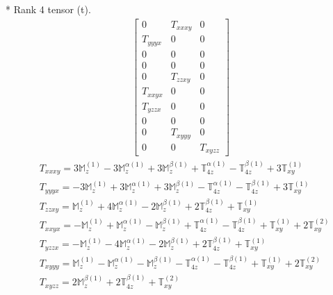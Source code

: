 \documentclass[fleqn,8pt,landscape]{jsarticle}
\begin{document}
* Rank 4 tensor (t).
\begin{align*}
\begin{bmatrix} 0 & T_{xxxy} & 0 \\ T_{yyyx} & 0 & 0 \\ 0 & 0 & 0 \\ 0 & 0 & 0 \\ 0 & T_{zzxy} & 0 \\ T_{xxyx} & 0 & 0 \\ T_{yzzx} & 0 & 0 \\ 0 & 0 & 0 \\ 0 & T_{xyyy} & 0 \\ 0 & 0 & T_{xyzz} \end{bmatrix}
\end{align*}
\begin{align*}
& T_{xxxy} = 3 \mathbb{M}_{z}^{(1)} - 3 \mathbb{M}_{z}^{\alpha(1)} + 3 \mathbb{M}_{z}^{\beta(1)} + \mathbb{T}_{4z}^{\alpha(1)} - \mathbb{T}_{4z}^{\beta(1)} + 3 \mathbb{T}_{xy}^{(1)} \\
& T_{yyyx} = - 3 \mathbb{M}_{z}^{(1)} + 3 \mathbb{M}_{z}^{\alpha(1)} + 3 \mathbb{M}_{z}^{\beta(1)} - \mathbb{T}_{4z}^{\alpha(1)} - \mathbb{T}_{4z}^{\beta(1)} + 3 \mathbb{T}_{xy}^{(1)} \\
& T_{zzxy} = \mathbb{M}_{z}^{(1)} + 4 \mathbb{M}_{z}^{\alpha(1)} - 2 \mathbb{M}_{z}^{\beta(1)} + 2 \mathbb{T}_{4z}^{\beta(1)} + \mathbb{T}_{xy}^{(1)} \\
& T_{xxyx} = - \mathbb{M}_{z}^{(1)} + \mathbb{M}_{z}^{\alpha(1)} - \mathbb{M}_{z}^{\beta(1)} + \mathbb{T}_{4z}^{\alpha(1)} - \mathbb{T}_{4z}^{\beta(1)} + \mathbb{T}_{xy}^{(1)} + 2 \mathbb{T}_{xy}^{(2)} \\
& T_{yzzx} = - \mathbb{M}_{z}^{(1)} - 4 \mathbb{M}_{z}^{\alpha(1)} - 2 \mathbb{M}_{z}^{\beta(1)} + 2 \mathbb{T}_{4z}^{\beta(1)} + \mathbb{T}_{xy}^{(1)} \\
& T_{xyyy} = \mathbb{M}_{z}^{(1)} - \mathbb{M}_{z}^{\alpha(1)} - \mathbb{M}_{z}^{\beta(1)} - \mathbb{T}_{4z}^{\alpha(1)} - \mathbb{T}_{4z}^{\beta(1)} + \mathbb{T}_{xy}^{(1)} + 2 \mathbb{T}_{xy}^{(2)} \\
& T_{xyzz} = 2 \mathbb{M}_{z}^{\beta(1)} + 2 \mathbb{T}_{4z}^{\beta(1)} + \mathbb{T}_{xy}^{(2)}
\end{align*}
\end{document}
